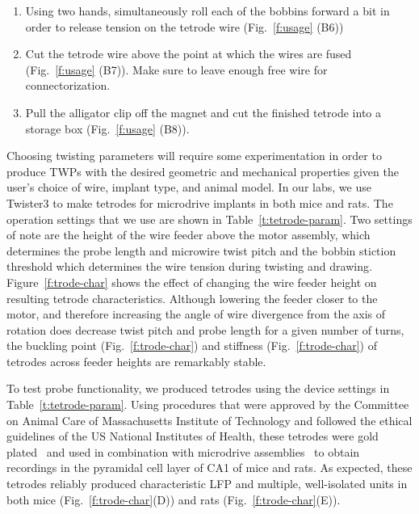 \documentclass[11pt,a4paper]{article}
\begin{document}
\begin{enumerate}[noitemsep]
{        separate towards the bobbins} using the hot air gun at
        $\sim$\SI{480}{\celsius} (Fig.~\ref{f:usage} (B5)). We have found that
        fusing from the bottom will cause the lower portion of the TWP to
        `absorb' slack from above resulting in a very fine twist pitch and a
        TWP that is shorter than intended.
    \item Using two hands, simultaneously roll each of the bobbins forward a
        bit in order to release tension on the tetrode wire (Fig.~\ref{f:usage}
        (B6))
    \item Cut the tetrode wire above the point at which the wires are fused
        (Fig.~\ref{f:usage} (B7)). Make sure to leave enough free wire for
        connectorization.
    \item Pull the alligator clip off the magnet and cut the finished tetrode
        into a storage box (Fig.~\ref{f:usage} (B8)).
\end{enumerate}

Choosing twisting parameters will require some experimentation in order to
produce TWPs with the desired geometric and mechanical properties given the
user's choice of wire, implant type, and animal model. In our labs, we use
Twister3 to make tetrodes for microdrive implants in both mice and rats. The
operation settings that we use are shown in Table~\ref{t:tetrode-param}.  Two
settings of note are the height of the wire feeder above the motor assembly,
which determines the probe length and microwire twist pitch and the bobbin
stiction threshold which determines the wire tension during twisting and
drawing.  Figure~\ref{f:trode-char} shows the effect of changing the wire
feeder height on resulting tetrode characteristics. Although lowering the
feeder closer to the motor, and therefore increasing the angle of wire
divergence from the axis of rotation does decrease twist pitch and probe length
for a given number of turns, the buckling point (Fig.~\ref{f:trode-char}) and
stiffness (Fig.~\ref{f:trode-char}) of tetrodes across feeder heights are
remarkably stable.

To test probe functionality, we produced tetrodes using the device settings in
Table~\ref{t:tetrode-param}. Using procedures that were approved by the
Committee on Animal Care of Massachusetts Institute of Technology and followed
the ethical guidelines of the US National Institutes of Health, these tetrodes
were gold plated~\cite{Nguyen2009} and used in combination with microdrive
assemblies~\cite{Voigts2013,Kloosterman2009} to obtain recordings in the
pyramidal cell layer of CA1 of mice and rats. As expected, these tetrodes
reliably produced characteristic LFP and multiple, well-isolated units in both
mice (Fig.~\ref{f:trode-char}(D)) and rats (Fig.~\ref{f:trode-char}(E)).
\end{document}
